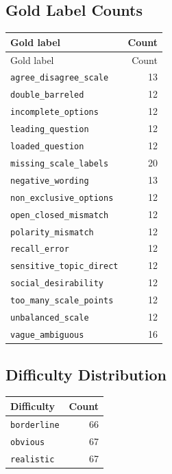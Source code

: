 \documentclass[10pt,a4paper]{article}
\begin{document}
\subsection{Gold Label Counts}
\begin{longtable}{@{}lr@{}}
\toprule
Gold label & Count\\
\midrule
\endfirsthead
\toprule
Gold label & Count\\
\midrule
\endhead
\texttt{agree\_disagree\_scale} & 13\\
\texttt{double\_barreled} & 12\\
\texttt{incomplete\_options} & 12\\
\texttt{leading\_question} & 12\\
\texttt{loaded\_question} & 12\\
\texttt{missing\_scale\_labels} & 20\\
\texttt{negative\_wording} & 13\\
\texttt{non\_exclusive\_options} & 12\\
\texttt{open\_closed\_mismatch} & 12\\
\texttt{polarity\_mismatch} & 12\\
\texttt{recall\_error} & 12\\
\texttt{sensitive\_topic\_direct} & 12\\
\texttt{social\_desirability} & 12\\
\texttt{too\_many\_scale\_points} & 12\\
\texttt{unbalanced\_scale} & 12\\
\texttt{vague\_ambiguous} & 16\\
\bottomrule
\end{longtable}
\subsection{Difficulty Distribution}
\begin{tabular}{@{}lr@{}}
\toprule
Difficulty & Count\\
\midrule
\texttt{borderline} & 66\\
\texttt{obvious} & 67\\
\texttt{realistic} & 67\\
\bottomrule
\end{tabular}
\end{document}
